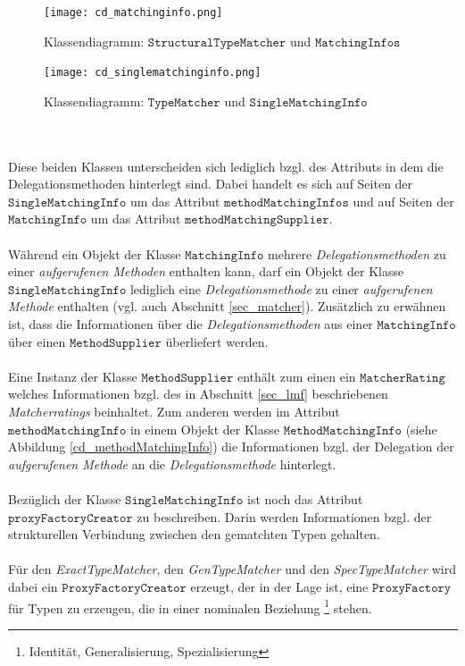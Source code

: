 \begin{figure}[h!]
\texttt{[image: cd\_matchinginfo.png]}
\caption{Klassendiagramm: $\texttt{StructuralTypeMatcher}$ und $\texttt{MatchingInfos}$}
\label{fig_cdMatchingInfo}
\end{figure}
\begin{figure}[h!]
\texttt{[image: cd\_singlematchinginfo.png]}
\caption{Klassendiagramm: $\texttt{TypeMatcher}$ und $\texttt{SingleMatchingInfo}$}
\label{fig_cdSingleMatchingInfo}
\end{figure}
\noindent
\\\\
Diese beiden Klassen unterscheiden sich lediglich bzgl. des Attributs in dem die Delegationsmethoden hinterlegt sind. Dabei handelt es sich auf Seiten der $\texttt{SingleMatchingInfo}$ um das Attribut $\texttt{methodMatchingInfos}$ und auf Seiten der $\texttt{MatchingInfo}$ um das Attribut $\texttt{methodMatchingSupplier}$. 
\\\\
Während ein Objekt der Klasse $\texttt{MatchingInfo}$ mehrere \emph{Delegationsmethoden} zu einer \emph{aufgerufenen Methoden} enthalten kann, darf ein Objekt der Klasse $\texttt{SingleMatchingInfo}$ lediglich eine \emph{Delegationsmethode} zu einer \emph{aufgerufenen Methode} enthalten (vgl. auch Abschnitt \ref{sec_matcher}). Zusätzlich zu erwähnen ist, dass die Informationen über die \emph{Delegationsmethoden} aus einer $\texttt{MatchingInfo}$ über einen $\texttt{MethodSupplier}$ überliefert werden.
\\\\
Eine Instanz der Klasse $\texttt{MethodSupplier}$ enthält zum einen ein $\texttt{MatcherRating}$ welches Informationen bzgl. des in Abschnitt \ref{sec_lmf} beschriebenen \emph{Matcherratings} beinhaltet. Zum anderen werden im Attribut $\texttt{methodMatchingInfo}$ in einem Objekt der Klasse $\texttt{MethodMatchingInfo}$ (siehe Abbildung \ref{cd_methodMatchingInfo}) die Informationen bzgl. der Delegation der \emph{aufgerufenen Methode} an die \emph{Delegationsmethode} hinterlegt. 
\\\\
Bezüglich der Klasse $\texttt{SingleMatchingInfo}$ ist noch das Attribut $\texttt{proxyFactoryCreator}$ zu beschreiben. Darin werden Informationen bzgl. der strukturellen Verbindung zwischen den gematchten Typen gehalten. 
\\\\
Für den \emph{ExactTypeMatcher}, den \emph{GenTypeMatcher} und den \emph{SpecTypeMatcher} wird dabei ein $\texttt{ProxyFactoryCreator}$ erzeugt, der in der Lage ist, eine $\texttt{ProxyFactory}$ für Typen zu erzeugen, die in einer nominalen Beziehung \footnote{Identität, Generalisierung, Spezialisierung} stehen. 
